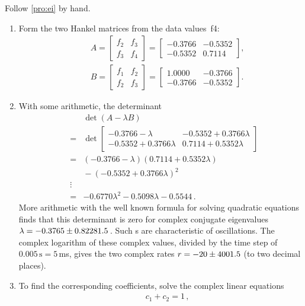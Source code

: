 \begin{example}
\begin{solution} 
Follow \autoref{pro:ei} by hand. 
\begin{enumerate}
\item 
Form the two Hankel matrices from the data values~\hlist f4:
\begin{eqnarray*}&&
A=\begin{bmatrix} f_2&f_3\\f_3&f_4 \end{bmatrix}
=\begin{bmatrix} -0.3766 & -0.5352
\\  -0.5352&   0.7114 \end{bmatrix},
\\&&
B=\begin{bmatrix} f_1&f_2\\f_2&f_3 \end{bmatrix}
=\begin{bmatrix} 1.0000&  -0.3766
\\  -0.3766&  -0.5352 \end{bmatrix}.
\end{eqnarray*}
\item 
With some arithmetic, the determinant 
\begin{eqnarray*}
&&\det(A-\lambda B)
\\&=&\det\begin{bmatrix} -0.3766-\lambda & -0.5352+0.3766\lambda
\\  -0.5352+0.3766\lambda&   0.7114+0.5352\lambda \end{bmatrix} 
\\&=&(-0.3766-\lambda)(0.7114+0.5352\lambda)
\\&&{}
-(-0.5352+0.3766\lambda)^2
\\&\vdots& 
\\&=& -0.6770\lambda^2  -0.5098\lambda  -0.5544\,.
\end{eqnarray*}
More arithmetic with the well known formula for solving quadratic equations finds that this determinant is zero for complex conjugate eigenvalues \(\lambda=-0.3765 \pm 0.82281.5\)\,.
Such s are characteristic of oscillations.
The complex logarithm of these complex values, divided by the time step of \(0.005\,\text{s}=5\,\)ms, gives the two complex rates \(r=-20\pm4001.5\) (to two decimal places).
\item 
To find the corresponding coefficients, solve the complex linear equations
\begin{eqnarray*}&&
c_1+c_2=1\,, 
\\&&

\end{eqnarray*}
\end{enumerate}
\end{solution}
\end{example}
